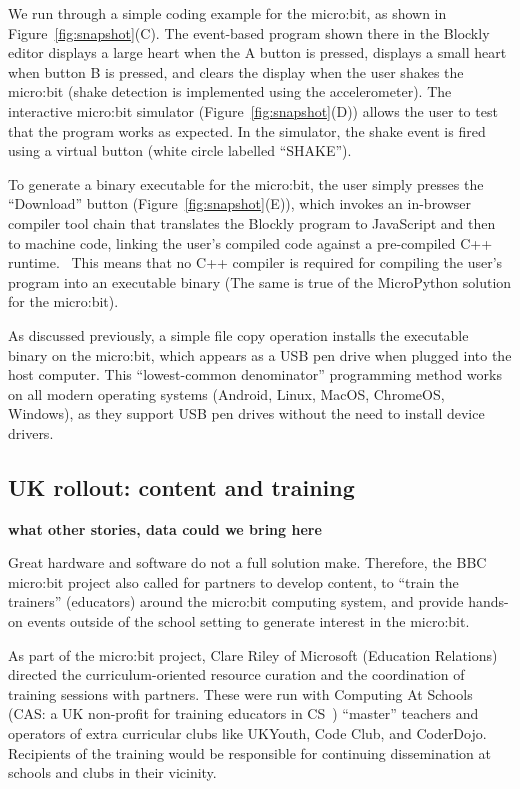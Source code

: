 We run through a simple coding example for the micro:bit, as shown
in Figure~\ref{fig:snapshot}(C). The event-based program shown there
in the Blockly editor displays a large heart when the
A button is pressed, displays a small heart when button B is pressed,
and clears the display when the user shakes the micro:bit (shake
detection is implemented using the accelerometer). The interactive
micro:bit simulator
(Figure~\ref{fig:snapshot}(D)) allows the user to test that
the program works as expected. In the simulator, the
shake event is fired using a virtual button (white circle labelled
``SHAKE'').

To generate a binary executable for the micro:bit, the user
simply presses the ``Download'' button (Figure~\ref{fig:snapshot}(E)),
which invokes an in-browser compiler tool chain that translates
the Blockly program to JavaScript and then to machine code, linking
the user's compiled code against a pre-compiled
C++ runtime.~\cite{Devine2018} 
This means that no C++ compiler is required for
compiling the user's program into an executable binary
(The same is true of the MicroPython solution for the micro:bit).

As discussed previously, a simple file copy operation installs the
executable binary on the micro:bit, which appears as a USB pen drive
when plugged into the host computer. This ``lowest-common denominator''
programming method works on all modern operating systems 
(Android, Linux, MacOS, ChromeOS, Windows), as they support 
USB pen drives without the need to install device drivers. 

\subsection{UK rollout: content and training}

{\bf what other stories, data could we bring here }

Great hardware and software do not a full solution make. 
Therefore,
the BBC micro:bit project also called for partners to develop content,
to ``train the trainers'' (educators) around the micro:bit computing
system, and provide hands-on events outside of the school setting to
generate interest in the micro:bit.

As part of the micro:bit project, Clare Riley of Microsoft (Education Relations) directed the curriculum-oriented resource curation and the coordination of training sessions with partners. These were run with Computing At Schools (CAS: a UK non-profit for training educators in CS~\cite{crick2011computing}) ``master'' teachers and operators of extra curricular clubs like UKYouth, Code Club, and CoderDojo. Recipients of the training would be responsible for continuing dissemination at schools and clubs in their vicinity.

